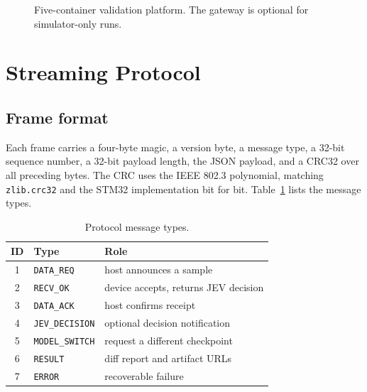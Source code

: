 \documentclass[conference]{IEEEtran}
\begin{document}
\begin{figure}[t]
\centering
{}
\caption{Five-container validation platform. The gateway is optional for
simulator-only runs.}
\label{fig:arch}
\end{figure}

\section{Streaming Protocol}
\subsection{Frame format}
Each frame carries a four-byte magic, a version byte, a message type, a 32-bit
sequence number, a 32-bit payload length, the JSON payload, and a CRC32 over all
preceding bytes. The CRC uses the IEEE 802.3 polynomial, matching
\texttt{zlib.crc32} and the STM32 implementation bit for bit.
Table~\ref{tab:frames} lists the message types.

\begin{table}[t]
\centering
\caption{Protocol message types.}
\label{tab:frames}
\begin{tabular}{@{}cll@{}}
\toprule
ID & Type & Role \\
\midrule
1 & \texttt{DATA\_REQ} & host announces a sample \\
2 & \texttt{RECV\_OK} & device accepts, returns JEV decision \\
3 & \texttt{DATA\_ACK} & host confirms receipt \\
4 & \texttt{JEV\_DECISION} & optional decision notification \\
5 & \texttt{MODEL\_SWITCH} & request a different checkpoint \\
6 & \texttt{RESULT} & diff report and artifact URLs \\
7 & \texttt{ERROR} & recoverable failure \\
\bottomrule
\end{tabular}
\end{table}
\end{document}
